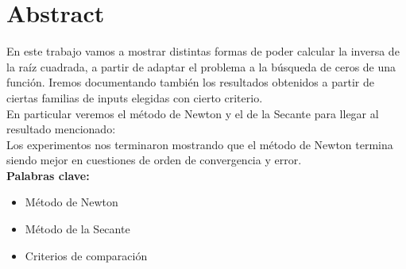 \documentclass[10pt,a4paper]{article} \usepackage[utf8]{inputenc} %
\begin{document}
 

\fecha{\today}





\maketitle

\section{Abstract} En este trabajo vamos a mostrar distintas formas de poder
calcular la inversa de la raíz cuadrada, a partir de adaptar el problema a la
búsqueda de ceros de una función. Iremos documentando también los resultados
obtenidos a partir de ciertas familias de inputs elegidas con cierto
criterio.\\

En particular veremos el método de Newton y el de la Secante para llegar al
resultado mencionado:\\

Los experimentos nos terminaron mostrando que el método de Newton termina
siendo mejor en cuestiones de orden de convergencia y error.\\

{\bf Palabras clave:} \begin{itemize} \item Método de Newton \item Método de la
        Secante \item Criterios de comparación \end{itemize}
\end{document}
